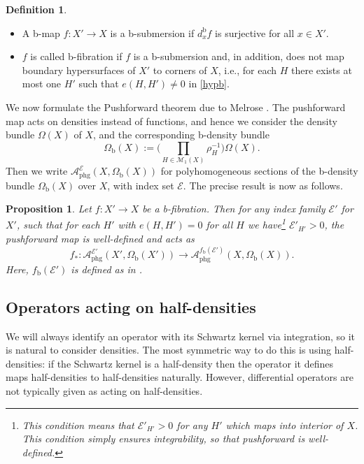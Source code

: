 \documentclass[11pt]{article}
\newcommand{\ie}{i.e.,\xspace}
\newcommand{\skpt}{\smallskip}
\numberwithin{equation}{section}
\theoremstyle{plain}
\newtheorem{Prop}[Th]{Proposition}
\theoremstyle{definition}
\newtheorem{defn}[Th]{Definition}
\newcommand\calE{{\mathcal E}}
\newcommand\calM{{\mathcal M}}
\newcommand {\phg}{{\mathrm{phg}}}
\newcommand{\bb}{{\mathrm{b}}}
\begin{document}
\skpt
\begin{defn}\label{b-fib}
\begin{itemize}
\item A b-map $f: X' \to X$ is a b-submersion if $d_{x}^{\bb}f$ is surjective
for all $x \in X'$.
\item $f$ is called b-fibration if $f$ is a b-submersion and, in addition,
does not map boundary hypersurfaces of $X'$ to
corners of $X$, \ie for each $H$ there exists
at most one $H'$ such that $e(H,H') \neq 0$ in \eqref{hypb}.
\end{itemize}
\end{defn}

We now formulate the Pushforward theorem due to Melrose \cite{melrose1993atiyah}.
The pushforward map acts on densities instead of functions, and hence we consider the
density bundle $\Omega(X)$ of $X$, and the corresponding b-density
bundle
\begin{equation}
\label{eqn:def omega b}
\Omega_\bb(X) := \biggl(\prod\limits_{H\in\calM_1(X)} \rho_H^{-1}\biggr) \Omega(X).
\end{equation}
Then we write $\mathcal{A}_{\phg}^{\mathcal{E}}(X, \Omega_\bb(X))$ for polyhomogeneous
sections of the b-density bundle $\Omega_\bb(X)$ over $X$, with index set $\mathcal{E}$.
The precise result is now as follows.

\begin{Prop} \label{pushforward}
Let $f : X' \to X$ be a b-fibration.
Then for any index family $\mathcal{E}'$
for $X'$, such that for each
$H'$ with $e(H,H') = 0$ for all $H$ we have\footnote{This condition means that $\calE'_{H'}> 0$ for
any $H'$ which maps into interior of $X$. This condition simply ensures
integrability, so that pushforward is well-defined.} $\calE'_{H'} > 0$,
the pushforward map is well-defined and acts as
\[
f_{*}: \mathcal{A}_{\phg}^{\mathcal{E}'}(X',\Omega_\bb(X'))
\to \mathcal{A}_{\phg}^{f_\bb
(\mathcal{E}')}(X,\Omega_\bb(X)).
\]
Here, $f_\bb(\mathcal{E}')$ is defined as in \cite[A.15]{mazzeorafe1991elliptic}.
\end{Prop}

\subsection{Operators acting on half-densities} \label{subsec:half densities}
We will always identify an operator with its Schwartz kernel via integration, so
it is natural to consider densities. The most symmetric way to do this is
using half-densities: if the Schwartz kernel is a half-density then the operator
it defines maps half-densities to half-densities naturally. However, differential operators are
not typically given as acting on half-densities.
\end{document}
